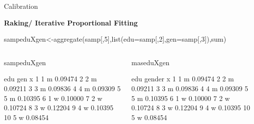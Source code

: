 \documentclass[11pt,german,hideothersubsections]{beamer}
\begin{document}
\begin{frame}[fragile]{Calibration}
\vspace{-.25cm}
\footnotesize{
\begin{center}
\textbf{Raking/ Iterative Proportional Fitting}
\end{center}
\begin{Schunk}
\begin{Sinput}
 sampeduXgen<-aggregate(samp[,5],list(edu=samp[,2],gen=samp[,3]),sum)
\end{Sinput}
\end{Schunk}
\begin{columns}
\begin{column}{.5\textwidth}
\begin{Schunk}
\begin{Sinput}
 sampeduXgen
\end{Sinput}
\begin{Soutput}
   edu gen       x
1    1   m 0.09474
2    2   m 0.09211
3    3   m 0.09836
4    4   m 0.09309
5    5   m 0.10395
6    1   w 0.10000
7    2   w 0.10724
8    3   w 0.12204
9    4   w 0.10395
10   5   w 0.08454
\end{Soutput}
\end{Schunk}
\end{column}
\begin{column}{.5\textwidth}
\begin{Schunk}
\begin{Sinput}
 maseduXgen
\end{Sinput}
\begin{Soutput}
   edu gender       x
1    1      m 0.09474
2    2      m 0.09211
3    3      m 0.09836
4    4      m 0.09309
5    5      m 0.10395
6    1      w 0.10000
7    2      w 0.10724
8    3      w 0.12204
9    4      w 0.10395
10   5      w 0.08454
\end{Soutput}
\end{Schunk}
\end{column}
\end{columns}
}
\end{frame}
\end{document}

